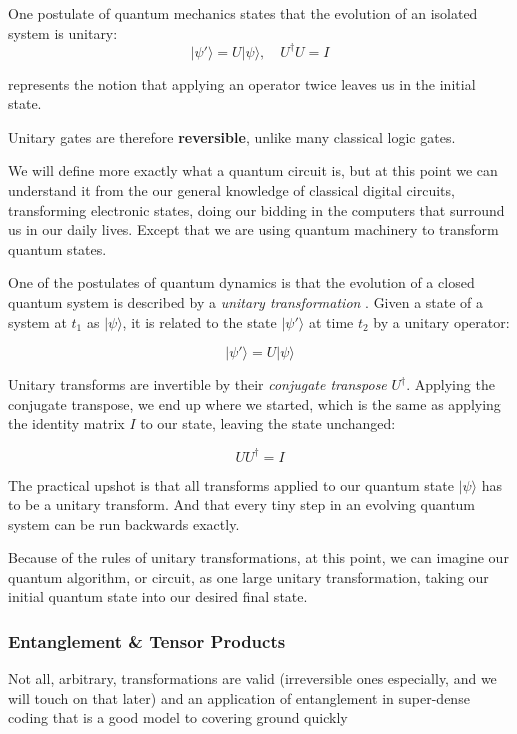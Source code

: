 One postulate of quantum mechanics states that the evolution of an isolated system is unitary:
$$ \lvert \psi'\rangle = U \lvert \psi \rangle, \quad U^{\dagger} U = I$$

represents the notion that applying an operator twice leaves us in the initial state.

Unitary gates are therefore \textbf{reversible}, unlike many classical logic gates. 


We will define more exactly what a quantum circuit is, 
but at this point we can understand it from the our general knowledge of classical digital circuits,
transforming electronic states, doing our bidding in the computers that surround us in our daily lives.
Except that we are using quantum machinery to transform quantum states.

One of the postulates of quantum dynamics is that the evolution of a closed quantum system is described by a
\emph{unitary transformation} \cite{Nielsen:2000}.  
Given a state of a system at $t_1$ as $|\psi\rangle$, it is related to the state $|\psi'\rangle$ at time $t_2$ 
by a unitary operator:

$$|\psi'\rangle = U|\psi\rangle$$

Unitary transforms are invertible by their \emph{conjugate transpose} $U^\dag$.  
Applying the conjugate transpose, we end up where we started, 
which is the same as applying the identity matrix $I$ to our state, leaving the state unchanged:

$$UU^\dag = I$$

The practical upshot is that all transforms applied to our quantum state $|\psi\rangle$ has to be a unitary transform.
And that every tiny step in an evolving quantum system can be run backwards exactly.

Because of the rules of unitary transformations, at this point, we can imagine our quantum algorithm, or circuit, 
as one large unitary transformation, taking our initial quantum state into our desired final state.


\subsubsection{Entanglement \& Tensor Products}

Not all, arbitrary, transformations are valid (irreversible ones especially, and we will touch on that later)
and an application of entanglement in super-dense coding that is a good model to covering ground quickly \cite{Nielsen:2010}

